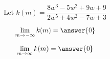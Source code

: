 \documentclass{ximera}
\author{Lee Wayand}
\begin{document}
\begin{exercise}


\begin{question}



\[
\text{Let }    k(m) = \frac{8 w^3 - 5 w^2 + 9 w + 9}{2 w^5 + 4 w^2 - 7w + 3}
\]



\[
\lim\limits_{m \to -\infty} k(m) = \answer{0} 
\]


\[
\lim\limits_{m \to \infty} k(m) = \answer{0} 
\]


\end{question}










\end{exercise}
\end{document}
